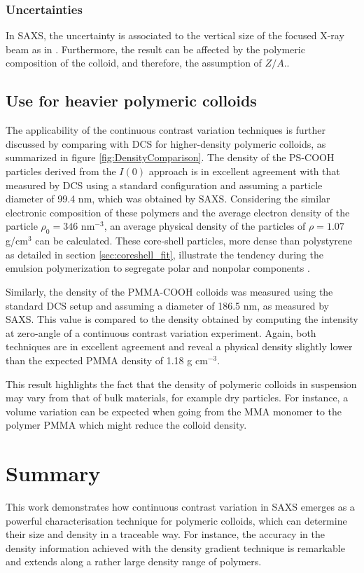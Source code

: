 \subsubsection{Uncertainties}
In SAXS, the uncertainty is associated to the vertical size of the focused X-ray beam as in \citep{garcia-diez_nanoparticle_2015}. Furthermore, the result can be affected by the polymeric composition of the colloid, and therefore, the assumption of $Z/A$..

\subsection{Use for heavier polymeric colloids}
The applicability of the continuous contrast variation techniques is further discussed by comparing with DCS for higher-density polymeric colloids, as summarized in figure \ref{fig:DensityComparison}. The density of the PS-COOH particles derived from the $I(0)$ approach is in excellent agreement with that measured by DCS using a standard configuration and assuming a particle diameter of 99.4 nm, which was obtained by SAXS. Considering the similar electronic composition of these polymers and the average electron density of the particle $\rho_0=346$ nm\(^{-3}\), an average physical density of the particles of $\rho=1.07$ g/cm\(^{3}\) can be calculated. These core-shell particles, more dense than polystyrene as detailed in section \ref{sec:coreshell_fit}, illustrate the tendency during the emulsion polymerization to segregate polar and nonpolar components \citep{dingenouts_structure_1994}.

Similarly, the density of the PMMA-COOH colloids was measured using the standard DCS setup and assuming a diameter of 186.5 nm, as measured by SAXS. This value is compared to the density obtained by computing the intensity at zero-angle of a continuous contrast variation experiment. Again, both techniques are in excellent agreement and reveal a physical density slightly lower than the expected PMMA density of 1.18 g cm$^{-3}$\citep{dingenouts_analysis_1999}.

This result highlights the fact that the density of polymeric colloids in suspension may vary from that of bulk materials, for example dry particles. For instance, a volume variation can be expected when going from the MMA monomer to the polymer PMMA\citep{nichols_prediction_1950} which might reduce the colloid density.

\section{Summary}
This work demonstrates how continuous contrast variation in SAXS emerges as a powerful characterisation technique for polymeric colloids, which can determine their size and density in a traceable way. For instance, the accuracy in the density information achieved with the density gradient technique is remarkable and extends along a rather large density range of polymers.

